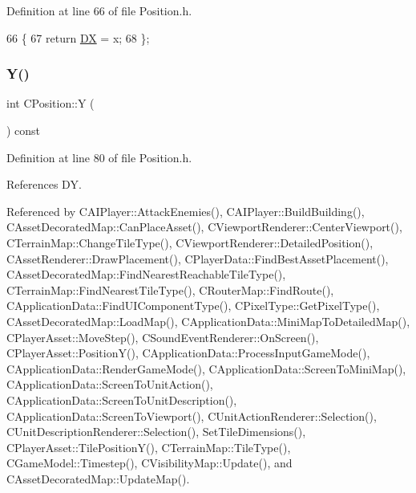 Definition at line 66 of file Position.\+h.


\begin{DoxyCode}
66                     \{
67             \textcolor{keywordflow}{return} \hyperlink{classCPosition_a28445f9b872169715919074d82044eda}{DX} = x;  
68         \};
\end{DoxyCode}
\hypertarget{classCPosition_a1aa8a30e2f08dda1f797736ba8c13a87}{}\label{classCPosition_a1aa8a30e2f08dda1f797736ba8c13a87} 
\subsubsection{\texorpdfstring{Y()}{Y()}\hspace{0.1cm}{\footnotesize\ttfamily [1/2]}}
{\footnotesize\ttfamily int C\+Position\+::Y (\begin{DoxyParamCaption}{ }\end{DoxyParamCaption}) const\hspace{0.3cm}{\ttfamily [inline]}}



Definition at line 80 of file Position.\+h.



References DY.



Referenced by C\+A\+I\+Player\+::\+Attack\+Enemies(), C\+A\+I\+Player\+::\+Build\+Building(), C\+Asset\+Decorated\+Map\+::\+Can\+Place\+Asset(), C\+Viewport\+Renderer\+::\+Center\+Viewport(), C\+Terrain\+Map\+::\+Change\+Tile\+Type(), C\+Viewport\+Renderer\+::\+Detailed\+Position(), C\+Asset\+Renderer\+::\+Draw\+Placement(), C\+Player\+Data\+::\+Find\+Best\+Asset\+Placement(), C\+Asset\+Decorated\+Map\+::\+Find\+Nearest\+Reachable\+Tile\+Type(), C\+Terrain\+Map\+::\+Find\+Nearest\+Tile\+Type(), C\+Router\+Map\+::\+Find\+Route(), C\+Application\+Data\+::\+Find\+U\+I\+Component\+Type(), C\+Pixel\+Type\+::\+Get\+Pixel\+Type(), C\+Asset\+Decorated\+Map\+::\+Load\+Map(), C\+Application\+Data\+::\+Mini\+Map\+To\+Detailed\+Map(), C\+Player\+Asset\+::\+Move\+Step(), C\+Sound\+Event\+Renderer\+::\+On\+Screen(), C\+Player\+Asset\+::\+Position\+Y(), C\+Application\+Data\+::\+Process\+Input\+Game\+Mode(), C\+Application\+Data\+::\+Render\+Game\+Mode(), C\+Application\+Data\+::\+Screen\+To\+Mini\+Map(), C\+Application\+Data\+::\+Screen\+To\+Unit\+Action(), C\+Application\+Data\+::\+Screen\+To\+Unit\+Description(), C\+Application\+Data\+::\+Screen\+To\+Viewport(), C\+Unit\+Action\+Renderer\+::\+Selection(), C\+Unit\+Description\+Renderer\+::\+Selection(), Set\+Tile\+Dimensions(), C\+Player\+Asset\+::\+Tile\+Position\+Y(), C\+Terrain\+Map\+::\+Tile\+Type(), C\+Game\+Model\+::\+Timestep(), C\+Visibility\+Map\+::\+Update(), and C\+Asset\+Decorated\+Map\+::\+Update\+Map().


